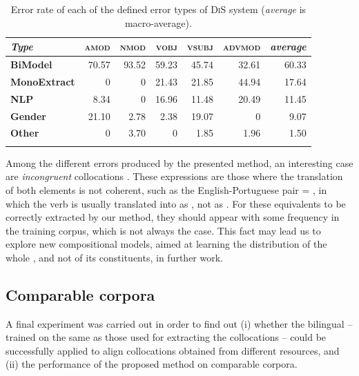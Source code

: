 \documentclass[output=paper
,modfonts
,nonflat]{langsci/langscibook}
\begin{document}
\begin{table}
  \begin{center}
    \caption{\label{tab:error} Error rate of each of the defined error types of \textsc{DiS} system (\emph{average} is macro-average).}
    \begin{tabular}{lrrrrrr}
      \lsptoprule
      \textbf{\emph{Type}}&\textbf{\textsc{amod}}&\textbf{\textsc{nmod}}&\textbf{\textsc{vobj}}&\textbf{\textsc{vsubj}}&\textbf{\textsc{advmod}}&\textbf{\emph{average}}\\
      \midrule
      \textbf{BiModel} & 70.57 & 93.52 & 59.23 & 45.74 & 32.61                 & 60.33\\
      \textbf{MonoExtract} & 0\phantom{00} & 0\phantom{00} & 21.43 & 21.85 & 44.94 & 17.64\\
      \textbf{NLP} & 8.34  & 0\phantom{00} & 16.96 & 11.48 & 20.49         & 11.45\\
      \textbf{Gender} & 21.10 & 2.78  & 2.38  & 19.07 & 0\phantom{00}         & 9.07\\
      \textbf{Other} & 0\phantom{00} & 3.70  & 0\phantom{00} & 1.85  & 1.96  & 1.50\\
      \lspbottomrule
    \end{tabular}
  \end{center}
\end{table}

Among the different errors produced by the presented method, an interesting case
are \emph{incongruent} collocations \citep{nesselhauf2003}. These expressions are
those where the translation of both elements is not coherent, such as the English-Portuguese pair  = , in which the verb  is usually translated into  as , not as .
For these  equivalents to be correctly extracted by our method, they should
appear with some frequency in the training corpus, which is not always the case. This fact
may lead us to explore new compositional models, aimed at learning the distribution of the
whole , and not of its constituents, in further work.

\subsection{Comparable corpora}
A final experiment was carried out in order to find out (i) whether the bilingual
 -- trained on the same  as those used for
extracting the collocations -- could be successfully applied to align collocations
obtained from different resources, and (ii) the performance of the proposed
method on comparable corpora.
\end{document}
